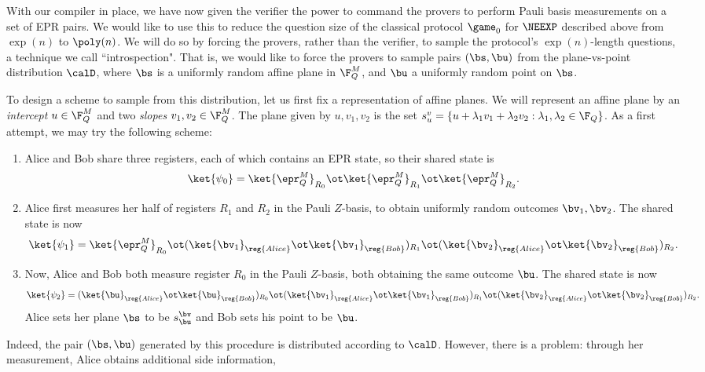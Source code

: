 With our compiler in place, we have now given the verifier the power
to command the provers to perform Pauli basis measurements on a set of
EPR pairs.
We would like to use this to reduce the question size of the classical protocol $\game_0$ for $\NEEXP$ described above
from $\exp(n)$ to $\poly(n)$.
We will do so by forcing the provers, rather than the verifier, to sample the protocol's $\exp(n)$-length questions,
a technique we call ``introspection".
That is, we would like to force the provers to
sample pairs $(\bs, \bu)$ from the plane-vs-point distribution $\calD$, where $\bs$ is a uniformly random
affine plane in $\F_Q^M$, and $\bu$ a uniformly random point on
$\bs$.

To design a scheme to sample from this distribution, let us first fix
a representation of affine planes. We will represent an affine plane
by an \emph{intercept} $u \in \F_Q^M$ and two \emph{slopes} $v_1, v_2
\in \F_Q^M$. The plane given by $u, v_1, v_2$ is the set $s_u^v = \{ u +
\lambda_1 v_1 + \lambda_2 v_2 : \lambda_1, \lambda_2 \in \F_Q\}$. As a
first attempt, we may try the following scheme:
\begin{enumerate}
  \item Alice and Bob share three registers, each of which contains an
    EPR state, so their shared state is
    \[ \ket{\psi_0} = \ket{\epr_Q^M}_{R_0} \ot \ket{\epr_Q^M}_{R_1} \ot
      \ket{\epr_Q^M}_{R_2}. \]
  \item Alice first measures her half of registers $R_1$ and $R_2$ in
    the Pauli $Z$-basis, to obtain uniformly random outcomes $\bv_1,
    \bv_2$. The shared state is now
    \[ \ket{\psi_1} = \ket{\epr_Q^M}_{R_0} \ot
      (\ket{\bv_1}_{\reg{Alice}} \ot \ket{\bv_1}_{\reg{Bob}})_{R_1} \ot
      (\ket{\bv_2}_{\reg{Alice}} \ot \ket{\bv_2}_{\reg{Bob}})_{R_2}. \]
  \item Now, Alice and Bob both measure register $R_0$ in the Pauli
    $Z$-basis, both obtaining the same outcome $\bu$. The shared state
    is now
    \[ \ket{\psi_2} = (\ket{\bu}_{\reg{Alice}} \ot
      \ket{\bu}_{\reg{Bob}})_{R_0}    \ot  (\ket{\bv_1}_{\reg{Alice}} \ot \ket{\bv_1}_{\reg{Bob}})_{R_1} \ot
      (\ket{\bv_2}_{\reg{Alice}} \ot \ket{\bv_2}_{\reg{Bob}})_{R_2}. \]
    Alice sets her plane $\bs$ to be $s_{\bu}^{\bv}$ and Bob sets his point to be $\bu$.
  \end{enumerate}
  Indeed, the pair $(\bs, \bu)$ generated by this procedure is
  distributed according to $\calD$. However, there is a problem:
  through her measurement, Alice obtains additional side information,
